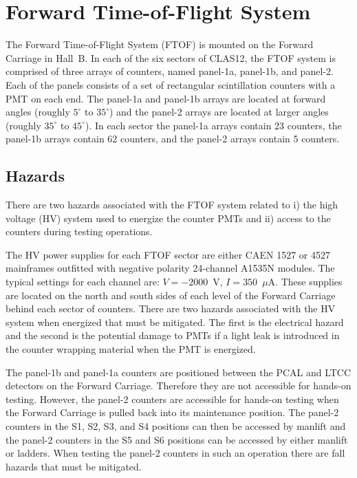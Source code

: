 \section{Forward Time-of-Flight System}

The Forward Time-of-Flight System (FTOF) is mounted on the Forward Carriage in Hall~B. 
In each of the six sectors of CLAS12, the FTOF system is comprised of three arrays of 
counters, named panel-1a, panel-1b, and panel-2. Each of the panels consists of a set 
of rectangular scintillation counters with a PMT on each end. The panel-1a and panel-1b 
arrays are located at forward angles (roughly $5^\circ$ to $35^\circ$) and the panel-2 
arrays are located at larger angles (roughly $35^\circ$ to $45^\circ$). In each sector 
the panel-1a arrays contain 23 counters, the panel-1b arrays contain 62 counters, and 
the panel-2 arrays contain 5 counters.

\subsection{Hazards} 

There are two hazards associated with the FTOF system related to i) the high voltage (HV)
system used to energize the counter PMTs and ii) access to the counters during testing 
operations.

The HV power supplies for each FTOF sector are either CAEN 1527 or 4527 mainframes outfitted
with negative polarity 24-channel A1535N modules. The typical settings
for each channel are: $V=-2000$~V, $I=350$~$\mu$A. These supplies are located on the north 
and south sides of each level of the Forward Carriage behind each sector of counters. There 
are two hazards associated with the HV system when energized that must be mitigated. The 
first is the electrical hazard and the second is the potential damage to PMTs if a light 
leak is introduced in the counter wrapping material when the PMT is energized.

The panel-1b and panel-1a counters are positioned between the PCAL and LTCC detectors on 
the Forward Carriage. Therefore they are not accessible for hands-on testing. However, 
the panel-2 counters are accessible for hands-on testing when the Forward Carriage is 
pulled back into its maintenance position. The panel-2 counters in the S1, S2, S3, and S4 
positions can then be accessed by manlift and the panel-2 counters in the S5 and S6 
positions can be accessed by either manlift or ladders. When testing the panel-2 counters 
in such an operation there are fall hazards that must be mitigated.

